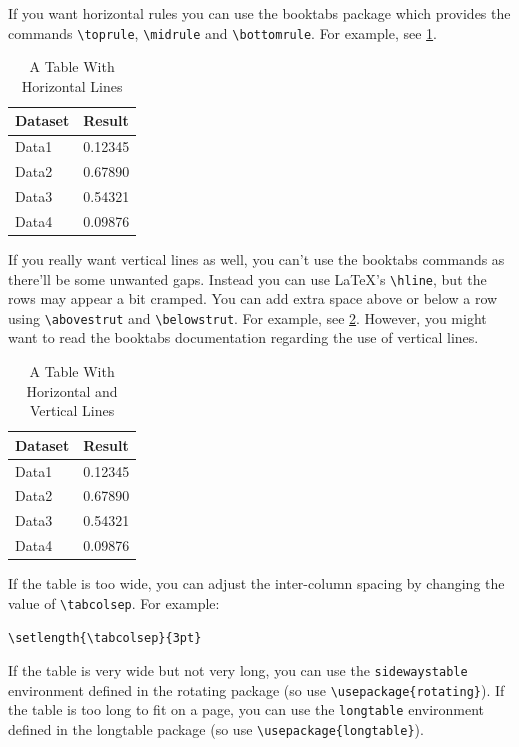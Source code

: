 \documentclass{article}
\begin{document}
If you want horizontal rules you can use the \textsf{booktabs}
package which provides the commands \verb|\toprule|, 
\verb|\midrule| and \verb|\bottomrule|. For example, see
\ref{table:example-booktabs}.

\begin{table}[hbtp]
  \label{table:example-booktabs}
  {\caption{A Table With Horizontal Lines}}
  {\begin{tabular}{ll}
  \toprule
  \bfseries Dataset & \bfseries Result\\
  \midrule
  Data1 & 0.12345\\
  Data2 & 0.67890\\
  Data3 & 0.54321\\
  Data4 & 0.09876\\
  \bottomrule
  \end{tabular}}
\end{table}

If you really want vertical lines as well, you can't use the
\textsf{booktabs} commands as there'll be some unwanted gaps.
Instead you can use \LaTeX's \verb|\hline|, but the rows may
appear a bit cramped.  You can add extra space above or below a
row using \verb|\abovestrut| and \verb|\belowstrut|. For example,
see \ref{table:example-hline}. However, you might want to read
the \textsf{booktabs} documentation regarding the use of vertical
lines.

\begin{table}[htbp]
  \label{table:example-hline}
  {\caption{A Table With Horizontal and Vertical Lines}}%
  {%
    \begin{tabular}{|l|l|}
    \hline
    \bfseries Dataset & \bfseries Result\\\hline
    Data1 & 0.12345\\
    Data2 & 0.67890\\
    Data3 & 0.54321\\
    Data4 & 0.09876\\\hline
    \end{tabular}
  }
\end{table}

If the table is too wide, you can adjust the inter-column
spacing by changing the value of \verb|\tabcolsep|. For
example:
\begin{verbatim}
\setlength{\tabcolsep}{3pt}
\end{verbatim}
If the table is very wide but not very long, you can use the
\texttt{sidewaystable} environment defined in the
\textsf{rotating} package (so use \verb|\usepackage{rotating}|).
If the table is too long to fit on a page, you can use the
\texttt{longtable} environment defined in the \textsf{longtable}
package (so use \verb|\usepackage{longtable}|).
\end{document}
